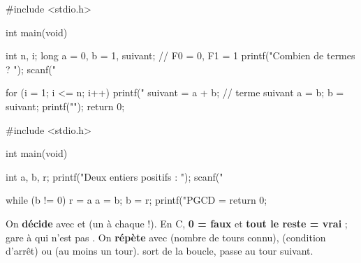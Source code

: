 \begin{codec}
#include <stdio.h>

int main(void) {
    int n, i;
    long a = 0, b = 1, suivant;   // F0 = 0, F1 = 1
    printf("Combien de termes ? ");
    scanf("%

    for (i = 1; i <= n; i++) {
        printf("%
        suivant = a + b;          // terme suivant
        a = b;
        b = suivant;
    }
    printf("\n");
    return 0;
}
\end{codec}


\begin{codec}
#include <stdio.h>

int main(void) {
    int a, b, r;
    printf("Deux entiers positifs : ");
    scanf("%

    while (b != 0) {
        r = a %
        a = b;
        b = r;
    }
    printf("PGCD = %
    return 0;
}
\end{codec}

\begin{aretenir}
On \textbf{décide} avec  et  (un 
à chaque  !). En C, \textbf{0 = faux} et \textbf{tout le reste = vrai} ;
gare à \code{=} qui n'est pas \code{==}. On \textbf{répète} avec  (nombre
de tours connu),  (condition d'arrêt) ou  (au moins
un tour).  sort de la boucle,  passe au tour suivant.
\end{aretenir}
